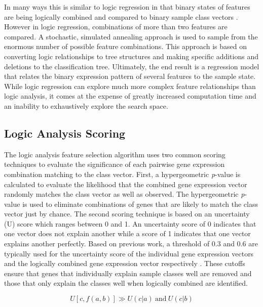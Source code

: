 In many ways this is similar to logic regression in that binary states of
features are being logically combined and compared to binary sample class
vectors \cite{ruczinski2004eih}.  However in logic regression, combinations of more
than two features are compared.  A stochastic, simulated annealing approach is
used to sample from the enormous number of possible feature combinations.  This
approach is based on converting logic relationships to tree structures and
making specific additions and deletions to the classification tree.
Ultimately, the end result is a regression model that relates the binary
expression pattern of several features to the sample state.  While logic
regression can explore much more complex feature relationships than logic
analysis, it comes at the expense of greatly increased computation time and an
inability to exhaustively explore the search space.

\subsection{Logic Analysis Scoring}

The logic analysis feature selection algorithm uses two common scoring
techniques to evaluate the significance of each pairwise gene expression combination
matching to the class vector.  First, a hypergeometric \emph{p}-value is 
calculated to evaluate the likelihood that the combined gene expression vector randomly
matches the class vector as well as observed.  The hypergeometric
\emph{p}-value is used to eliminate combinations of genes that are likely to
match the class vector just by chance. The second scoring technique is based on
an uncertainty (U) score which ranges between 0 and 1. An uncertainty score of
0 indicates that one vector does not explain another while a score of 1
indicates that one vector explains another perfectly.  Based on previous work, a
threshold of 0.3 and 0.6 are typically used for the uncertainty score of the
individual gene expression vectors and the logically combined gene expression
vector respectively \cite{PMID_170746732}.  These cutoffs ensure that genes that
individually explain sample classes well are removed and those that only
explain the classes well when logically combined are identified.

\begin{equation}\label{laeq1}
U \left[ c,  f \left( a, b \right)  \right]  \gg U \left( c | a \right) \ \mathrm{ and } \ U \left( c | b \right)
\end{equation}

